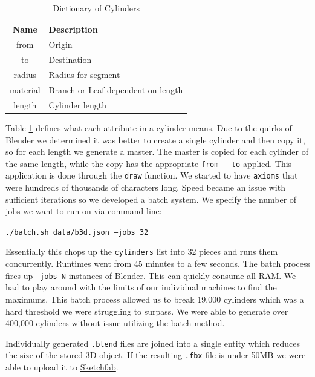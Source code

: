 \begin{table}
    \begin{center}
        \begin{tabular}{| c | l |}
            \hline
            \textbf{Name} & \textbf{Description}               \\ \hline
            from          & Origin                             \\ \hline
            to            & Destination                        \\ \hline
            radius        & Radius for segment                 \\ \hline
            material      & Branch or Leaf dependent on length \\ \hline
            length        & Cylinder length                    \\ \hline
        \end{tabular}
        \caption{Dictionary of Cylinders}
        \label{table:dict_cylinders}
    \end{center}
\end{table}

Table \ref{table:dict_cylinders} defines what each attribute in a cylinder
means. Due to the quirks of Blender we determined it was better to create a
single cylinder and then copy it, so for each length we generate a master. The
master is copied for each cylinder of the same length, while the copy has the
appropriate \texttt{from - to} applied. This application is done through the
\texttt{draw} function. We started to have \texttt{axioms} that
were hundreds of thousands of characters long. Speed became an issue with
sufficient iterations so we developed a batch system.  We specify the number of
jobs we want to run on via command line:

\texttt{./batch.sh data/b3d.json --jobs 32}

Essentially this chops up the \texttt{cylinders} list into 32 pieces and runs
them concurrently. Runtimes went from 45 minutes to a few seconds. The
batch process fires up \texttt{--jobs N} instances of Blender. This can
quickly consume all RAM. We had to play around with the limits of our
individual machines to find the maximums. This batch process allowed us to
break 19,000 cylinders which was a hard threshold we were struggling to surpass.
We were able to generate over 400,000 cylinders without issue utilizing the
batch method.

Individually generated \texttt{.blend} files are joined into a
single entity which reduces the size of the stored 3D object. If the resulting
\texttt{.fbx} file is under 50MB we were able to upload it to
\href{https://sketchfab.com/macattackftw/models}{Sketchfab}.

